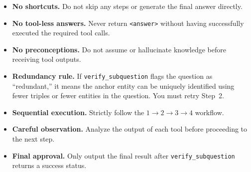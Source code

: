 \begin{table}[t!]
\begin{minipage}{\textwidth}
\begin{mdframed}[style=outerframe]
\begin{mdframed}[style=subframe]
\vspace{2pt}
\begin{itemize}[leftmargin=2em, itemsep=1pt, topsep=2pt, label=$\times$]
  \small
  \item \textbf{No shortcuts.} Do not skip any steps or generate the final answer directly.
  \item \textbf{No tool-less answers.} Never return \texttt{<answer>} without having successfully executed the required tool calls.
  \item \textbf{No preconceptions.} Do not assume or hallucinate knowledge before receiving tool outputs.
  \item \textbf{Redundancy rule.} If \texttt{verify\_subquestion} flags the question as ``redundant,'' it means the anchor entity can be uniquely identified using fewer triples or fewer entities in the question. You must retry Step~2.
\end{itemize}
 
\vspace{3pt}
\begin{itemize}[leftmargin=2em, itemsep=1pt, topsep=2pt, label=$\checkmark$]
  \small
  \item \textbf{Sequential execution.} Strictly follow the $1 \to 2 \to 3 \to 4$ workflow.
  \item \textbf{Careful observation.} Analyze the output of each tool before proceeding to the next step.
  \item \textbf{Final approval.} Only output the final result after \texttt{verify\_subquestion} returns a success status.
\end{itemize}
 
\end{mdframed}
 
\vspace{6pt}
 
 
\vspace{4pt}
\begin{mdframed}[style=subframe]
 
 
\vspace{2pt}
 
\vspace{4pt}
 

\end{mdframed}
\end{mdframed}
\end{minipage}
\end{table}
